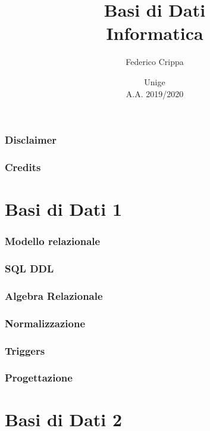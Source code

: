 \documentclass[10pt]{article}
\title{Basi di Dati\\\Large{Informatica}}
\author{Federico Crippa}
\date{Unige\\A.A. 2019/2020}
\begin{document}
\maketitle
\tableofcontents

\newpage
\section*{Disclaimer}


\section*{Credits}

\newpage

\part{Basi di Dati 1}
\section{Modello relazionale}


\newpage
\section{SQL DDL}


\section{Algebra Relazionale}


\section{Normalizzazione}


\newpage
\section{Triggers}


\newpage
\section{Progettazione}


\newpage
\part{Basi di Dati 2}
\end{document}
